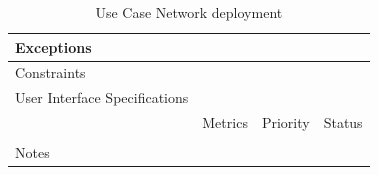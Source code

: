 \begin{table}[H]
\begin{tabularx}{\linewidth}{|l|X|X|X|}
            \hline Exceptions                    & \multicolumn{3}{l|}{}                                                                                 \\

            \hline Constraints                   & \multicolumn{3}{l|}{}                                                                                 \\

            \hline User Interface Specifications & \multicolumn{3}{l|}{}                                                                                 \\

            \hline \multirow{2}{*}{}             & Metrics                                                                           & Priority & Status \\
            \cline{2-4}                          &                                                                                   &          &        \\
            \hline Notes                         & \multicolumn{3}{l|}{}                                                                                 \\
            \hline
      \end{tabularx}
      \caption{Use Case Network deployment}
      \label{tab:use_case_network_deployment}
\end{table}

